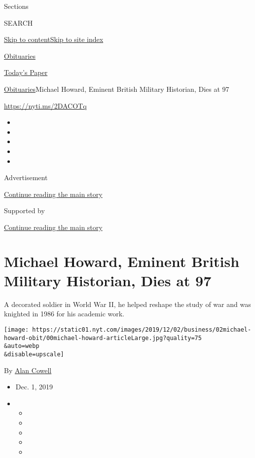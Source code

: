 Sections

SEARCH

\protect\hyperlink{site-content}{Skip to
content}\protect\hyperlink{site-index}{Skip to site index}

\href{https://www.nytimes.com/section/obituaries}{Obituaries}

\href{https://myaccount.nytimes.com/auth/login?response_type=cookie\&client_id=vi}{}

\href{https://www.nytimes.com/section/todayspaper}{Today's Paper}

\href{/section/obituaries}{Obituaries}\textbar{}Michael Howard, Eminent
British Military Historian, Dies at 97

\url{https://nyti.ms/2DACOTq}

\begin{itemize}
\item
\item
\item
\item
\item
\end{itemize}

Advertisement

\protect\hyperlink{after-top}{Continue reading the main story}

Supported by

\protect\hyperlink{after-sponsor}{Continue reading the main story}

\hypertarget{michael-howard-eminent-british-military-historian-dies-at-97}{%
\section{Michael Howard, Eminent British Military Historian, Dies at
97}\label{michael-howard-eminent-british-military-historian-dies-at-97}}

A decorated soldier in World War II, he helped reshape the study of war
and was knighted in 1986 for his academic work.

\texttt{[image: https://static01.nyt.com/images/2019/12/02/business/02michael-howard-obit/00michael-howard-articleLarge.jpg?quality=75\\\&auto=webp\\\&disable=upscale]}

By \href{https://www.nytimes.com/by/alan-cowell}{Alan Cowell}

\begin{itemize}
\item
  Dec. 1, 2019
\item
  \begin{itemize}
  \item
  \item
  \item
  \item
  \item
  \end{itemize}
\end{itemize}

